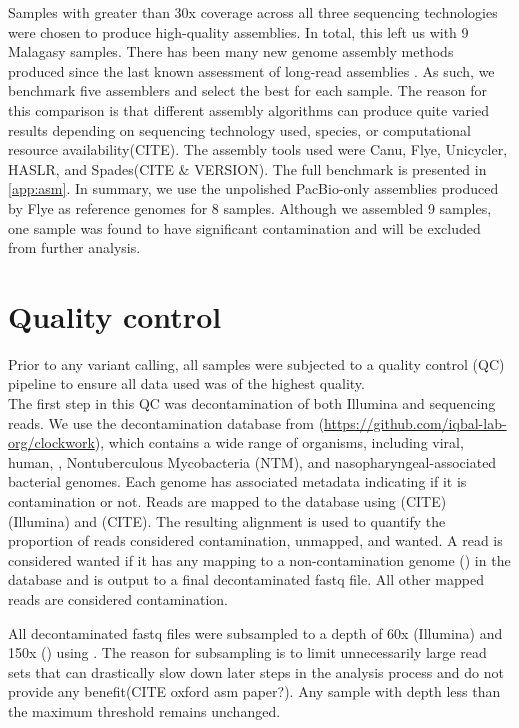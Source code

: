 Samples with greater than 30x coverage across all three sequencing technologies were chosen to produce high-quality assemblies. In total, this left us with 9 Malagasy samples. There has been many new genome assembly methods produced since the last known assessment of \mtb{} long-read assemblies \cite{bainomugisa2018}. As such, we benchmark five assemblers and select the best for each sample. The reason for this comparison is that different assembly algorithms can produce quite varied results depending on sequencing technology used, species, or computational resource availability(CITE). The assembly tools used were Canu, Flye, Unicycler, HASLR, and Spades(CITE \& VERSION). The full benchmark is presented in \autoref{app:asm}.
In summary, we use the unpolished PacBio-only assemblies produced by Flye as reference genomes for 8 samples. Although we assembled 9 samples, one sample was found to have significant contamination and will be excluded from further analysis.


\section{Quality control}
\label{sec:ch2-qc}

Prior to any variant calling, all samples were subjected to a quality control (QC) pipeline to ensure all data used was of the highest quality. \\
The first step in this QC was decontamination of both Illumina and \ont{} sequencing reads. We use the decontamination database from  (\url{https://github.com/iqbal-lab-org/clockwork}), which contains a wide range of organisms, including viral, human, \mtb{}, Nontuberculous Mycobacteria (NTM), and nasopharyngeal-associated bacterial genomes. Each genome has associated metadata indicating if it is contamination or not. Reads are mapped to the database using (CITE) (Illumina) and (CITE). The resulting alignment is used to quantify the proportion of reads considered contamination, unmapped, and wanted. A read is considered wanted if it has any mapping to a non-contamination genome (\mtb{}) in the database and is output to a final decontaminated fastq file. All other mapped reads are considered contamination. 

All decontaminated fastq files were subsampled to a depth of 60x (Illumina) and 150x (\ont{}) using  \cite{rasusa2019}. The reason for subsampling is to limit unnecessarily large read sets that can drastically slow down later steps in the analysis process and do not provide any benefit(CITE oxford asm paper?). Any sample with depth less than the maximum threshold remains unchanged.  

